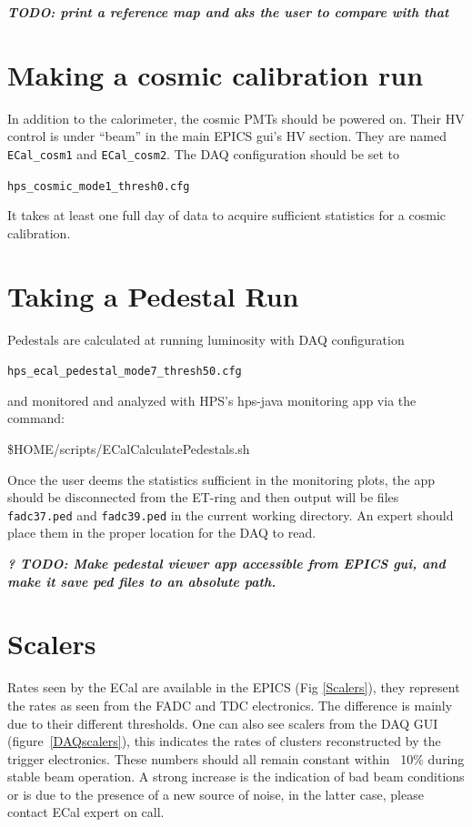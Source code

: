 \documentclass[12pt]{article}
\begin{document}
{\bf {\it TODO: print a reference map and aks the user to compare with that}}


   \section{Making a cosmic calibration run}

   In addition to the calorimeter, the cosmic PMTs should be powered on.  Their HV control is under ``beam'' in the main EPICS gui's HV section.  They are named \texttt{ECal\_cosm1} and \texttt{ECal\_cosm2}.  The DAQ configuration should be set to \begin{center}\texttt{hps\_cosmic\_mode1\_thresh0.cfg}\end{center}  It takes at least one full day of data to acquire sufficient statistics for a cosmic calibration.

   \section{Taking a Pedestal Run}

   Pedestals are calculated at running luminosity with DAQ configuration \begin{center}\texttt{hps\_ecal\_pedestal\_mode7\_thresh50.cfg}\end{center} and monitored and analyzed with HPS's hps-java monitoring app via the command:
   \begin{center}\$HOME/scripts/ECalCalculatePedestals.sh\end{center}
Once the user deems the statistics sufficient in the monitoring plots, the app should be disconnected from the ET-ring and then output will be files \texttt{fadc37.ped} and \texttt{fadc39.ped} in the current working directory.  An expert should place them in the proper location for the DAQ to read.

{\bf\it ? TODO: Make pedestal viewer app accessible from EPICS gui, and make it save ped files to an absolute path.}

      \section{Scalers}

         Rates seen by the ECal are available in the EPICS (Fig \ref{Scalers}), they represent the rates as seen from the FADC and TDC electronics. The difference is mainly due to their different thresholds. One can also see scalers from the DAQ GUI (figure~\ref{DAQscalers}), this indicates the rates of clusters reconstructed by the trigger electronics. These numbers should all remain constant within ~10\% during stable beam operation. A strong increase is the indication of bad beam conditions or is due to the presence of a new source of noise, in the latter case, please contact ECal expert on call.
\end{document}
